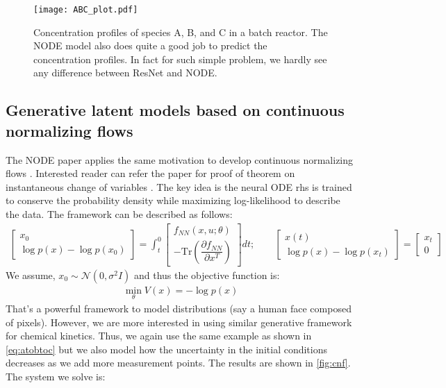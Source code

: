 \documentclass[fontsize=11pt]{article}
\theoremstyle{definition}
\begin{document}
\begin{figure}[h]
    \centering
    \texttt{[image: ABC\_plot.pdf]} 
    \caption{Concentration profiles of species A, B, and C in a batch reactor. The
    NODE model also does quite a good job to predict the concentration profiles. 
    In fact for such simple problem, we hardly see any difference between ResNet and NODE.}
    \label{fig:node}
\end{figure}

\subsection{Generative latent models based on continuous normalizing flows}

The NODE paper applies the same motivation to develop continuous normalizing flows
\citep{grathwohl:chen:bettencourt:sutskever:duvenaud:2018}.
Interested reader can refer the paper for proof of theorem on instantaneous change of variables
\citep{chen:rubanova:bettencourt:duvenaud:2018}.
The key idea is the neural ODE rhs is trained to conserve the probability density 
while maximizing log-likelihood to describe the data. The framework can be described 
as follows:
\begin{align}
    \begin{bmatrix}
        x_0 \\
        \log p(x) - \log p(x_0)
    \end{bmatrix}
    =
    \int_{t}^{0}
    \begin{bmatrix}
        f_{NN}(x, u; \theta) \\
        -\mathrm{Tr} \left(\dfrac{\partial f_{NN}}{\partial x^T}\right)
    \end{bmatrix} dt;
    \qquad
    \begin{bmatrix}
        x(t) \\
        \log p(x) - \log p(x_t)
    \end{bmatrix}   
    =
    \begin{bmatrix}
        x_t \\
        0
    \end{bmatrix}
\end{align}
We assume, $x_0 \sim \mathcal{N}(0, \sigma^2I)$ and thus the objective function is:
\begin{align}
    \min\limits_{\theta} V(x) = -\log p(x)
\end{align}
That's a powerful framework to model distributions (say a human face composed of pixels).
However, we are more interested in using similar generative framework for chemical kinetics. 
Thus, we again use the same example as shown in \cref{eq:atobtoc} but we also model 
how the uncertainty in the initial conditions decreases as we add more measurement points.
The results are shown in \cref{fig:cnf}. The system we solve is:
\end{document}
